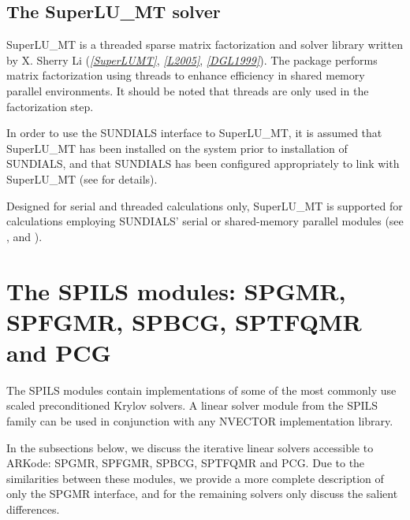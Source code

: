 \documentclass[letterpaper,10pt,english]{sphinxmanual}
\begin{document}
\subsection{The SuperLU\_MT solver}
\label{linear_solvers/SLS:the-superlu-mt-solver}
SuperLU\_MT is a threaded sparse matrix factorization and solver
library written by X. Sherry Li (\label{linear_solvers/SLS:id3}{\hyperref[References:superlumt]{\emph{{[}SuperLUMT{]}}}}, \label{linear_solvers/SLS:id4}{\hyperref[References:l2005]{\emph{{[}L2005{]}}}}, \label{linear_solvers/SLS:id5}{\hyperref[References:dgl1999]{\emph{{[}DGL1999{]}}}}).
The package performs matrix factorization using threads to enhance
efficiency in shared memory parallel environments.  It should be noted
that threads are only used in the factorization step.

In order to use the SUNDIALS interface to SuperLU\_MT, it is assumed
that SuperLU\_MT has been installed on the system prior to installation
of SUNDIALS, and that SUNDIALS has been configured appropriately to
link with SuperLU\_MT (see {\hyperref[Install:installation]{\emph{}}} for details).

Designed for serial and threaded calculations only, SuperLU\_MT is
supported for calculations employing SUNDIALS' serial or shared-memory
parallel  modules (see {\hyperref[nvectors/NVector_Serial:nvectors-nvserial]{\emph{}}},
{\hyperref[nvectors/NVector_OpenMP:nvectors-openmp]{\emph{}}} and {\hyperref[nvectors/NVector_Pthreads:nvectors-pthreads]{\emph{}}}).


\section{The SPILS modules: SPGMR, SPFGMR, SPBCG, SPTFQMR and PCG}
\label{linear_solvers/SPILS:the-spils-modules-spgmr-spfgmr-spbcg-sptfqmr-and-pcg}\label{linear_solvers/SPILS:linearsolvers-spils}\label{linear_solvers/SPILS::doc}
The SPILS modules contain implementations of some of the most commonly
use scaled preconditioned Krylov solvers.  A linear solver module from
the SPILS family can be used in conjunction with any NVECTOR
implementation library.

In the subsections below, we discuss the iterative linear solvers
accessible to ARKode: SPGMR, SPFGMR, SPBCG, SPTFQMR and PCG.  Due to
the similarities between these modules, we provide a more complete
description of only the SPGMR interface, and for the remaining solvers
only discuss the salient differences.
\end{document}
